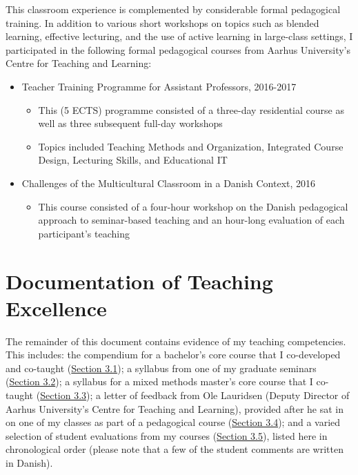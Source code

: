 \documentclass[11pt]{article}
\begin{document}
	This classroom experience is complemented by considerable formal pedagogical training. In addition to various short workshops on topics such as blended learning, effective lecturing, and the use of active learning in large-class settings, I participated in the following formal pedagogical courses from Aarhus University’s Centre for Teaching and Learning:\\[-5ex]

	\begin{itemize}[noitemsep]
		\item Teacher Training Programme for Assistant Professors, 2016-2017
		\begin{itemize}[noitemsep]
			\item	This (5 ECTS) programme consisted of a three-day residential course as well as three subsequent full-day workshops
			\item Topics included Teaching Methods and Organization, Integrated Course Design, Lecturing Skills, and Educational IT
		\end{itemize}
		\item Challenges of the Multicultural Classroom in a Danish Context, 2016
		\begin{itemize}[noitemsep]
			\item This course consisted of a four-hour workshop on the Danish pedagogical approach to seminar-based teaching and an hour-long evaluation of each participant's teaching\\[-5ex]
		\end{itemize}
	\end{itemize}

\smallskip

\section{ Documentation of Teaching Excellence}

The remainder of this document contains evidence of my teaching competencies. This includes: the compendium for a bachelor's core course that I co-developed and co-taught (\hyperref[sec:compendium]{Section 3.1}); a syllabus from one of my graduate seminars (\hyperref[sec:syllabus]{Section 3.2}); a syllabus for a mixed methods master's core course that I co-taught (\hyperref[sec:methods]{Section 3.3}); a letter of feedback from Ole Lauridsen (Deputy Director of Aarhus University’s Centre for Teaching and Learning), provided after he sat in on one of my classes as part of a pedagogical course (\hyperref[sec:letter]{Section 3.4}); and a varied selection of student evaluations from my courses (\hyperref[sec:evals]{Section 3.5}), listed here in chronological order (please note that a few of the student comments are written in Danish).
\end{document}
